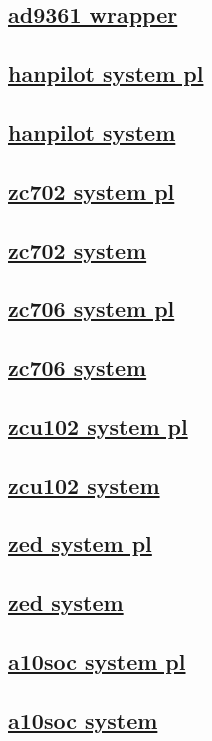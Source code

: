\documentclass{article}
\begin{document}
  


  \subsection{\href{../files2/ad9361_pl_wrapper-v.html}{ad9361 wrapper}}
  \subsection{\href{../files3/system_pl_wrapper-v.html}{hanpilot system pl}}
  \subsection{\href{../files3/system_wrapper-v.html}{hanpilot system}}
  \subsection{\href{../files4/system_pl_wrapper-v.html}{zc702 system pl}}
  \subsection{\href{../files4/system_wrapper-v.html}{zc702 system}}
  \subsection{\href{../files5/system_pl_wrapper-v.html}{zc706 system pl}}
  \subsection{\href{../files5/system_wrapper-v.html}{zc706 system}}
  \subsection{\href{../files6/system_pl_wrapper-v.html}{zcu102 system pl}}
  \subsection{\href{../files6/system_wrapper-v.html}{zcu102 system}}
  \subsection{\href{../files7/system_pl_wrapper-v.html}{zed system pl}}
  \subsection{\href{../files7/system_wrapper-v.html}{zed system}}
  \subsection{\href{../files/system_pl_wrapper-v.html}{a10soc system pl}}
  \subsection{\href{../files/system_wrapper-v.html}{a10soc system}}
\end{document}

